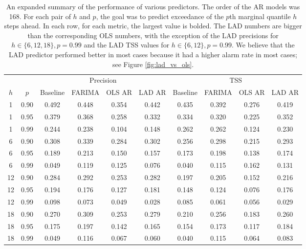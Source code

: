 \begin{table}[ht]
\centering
\begin{tabular}{cc|cccc|cccc}
  \hline
  & & \multicolumn{4}{c|}{Precision} & \multicolumn{4}{c}{TSS} \\
 $h$ & $p$ & Baseline & FARIMA & OLS AR & LAD AR & Baseline & FARIMA & OLS AR & LAD AR \\
 \hline
 1 & 0.90 & 0.492 & 0.448 & 0.354 & 0.442 & 0.435 & 0.392 & 0.276 & 0.419 \\ 
   1 & 0.95 & 0.379 & 0.368 & 0.258 & 0.332 & 0.334 & 0.320 & 0.225 & 0.352 \\ 
   1 & 0.99 & 0.244 & 0.238 & 0.104 & 0.148 & 0.262 & 0.262 & 0.124 & 0.230 \\ 
   \hline
 6 & 0.90 & 0.308 & 0.339 & 0.284 & 0.302 & 0.256 & 0.298 & 0.215 & 0.293 \\ 
   6 & 0.95 & 0.189 & 0.213 & 0.150 & 0.157 & 0.173 & 0.198 & 0.138 & 0.174 \\ 
   6 & 0.99 & 0.049 & 0.119 & 0.125 & 0.076 & 0.040 & 0.115 & 0.162 & 0.131 \\ 
   \hline
12 & 0.90 & 0.284 & 0.292 & 0.253 & 0.282 & 0.197 & 0.205 & 0.152 & 0.216 \\ 
  12 & 0.95 & 0.194 & 0.176 & 0.127 & 0.181 & 0.148 & 0.124 & 0.076 & 0.176 \\ 
  12 & 0.99 & 0.098 & 0.073 & 0.049 & 0.028 & 0.085 & 0.061 & 0.056 & 0.029 \\ 
   \hline
18 & 0.90 & 0.270 & 0.309 & 0.253 & 0.279 & 0.210 & 0.256 & 0.183 & 0.260 \\ 
  18 & 0.95 & 0.175 & 0.197 & 0.142 & 0.165 & 0.154 & 0.173 & 0.117 & 0.184 \\ 
  18 & 0.99 & 0.049 & 0.116 & 0.067 & 0.060 & 0.040 & 0.115 & 0.064 & 0.083 \\ 
   \hline
\end{tabular}
\caption{An expanded summary of the performance of various predictors. The order of the AR models was 168. For each pair of $h$ and $p$, the goal was to predict exceedance of the $p$th marginal quantile $h$ steps ahead. In each row, for each metric, the largest value is bolded. The LAD numbers are bigger than the corresponding OLS numbers, with the exception of the LAD precisions for $h \in \{6, 12, 18\}, p = 0.99$ and the LAD TSS values for $h \in \{6, 12\}, p = 0.99$. We believe that the LAD predictor performed better in most cases because it had a higher alarm rate in most cases; see Figure \ref{fig:lad_vs_ols}.} 
\label{tab:expanded_data_analysis_results}
\end{table}
